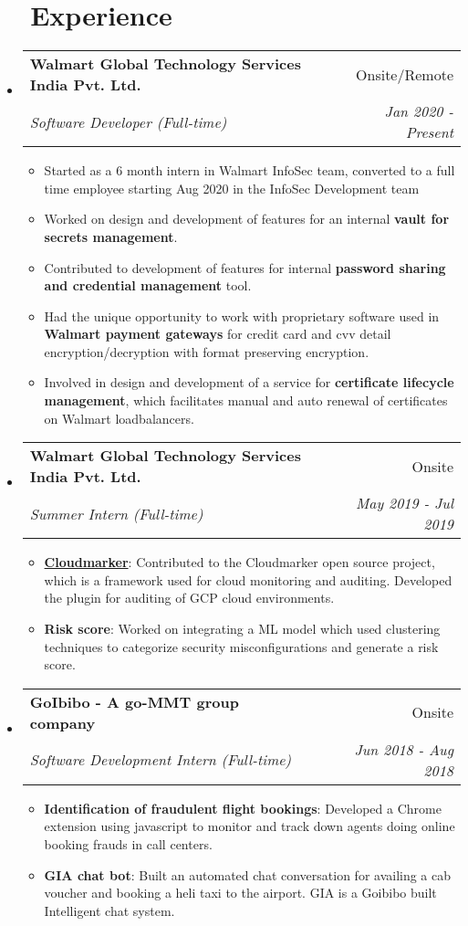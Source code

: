 \documentclass[a4paper,20pt]{article}
\makeatletter
\newcommand{\resumeItem}[2]{
  \item\small{
    \textbf{#1}{: #2 \vspace{-2pt}}
  }
}
\newcommand{\resumeSubheading}[4]{
  \vspace{-1pt}\item
    \begin{tabular*}{0.97\textwidth}{l@{\extracolsep{\fill}}r}
      \textbf{#1} & #2 \\
      \textit{#3} & \textit{#4} \\
    \end{tabular*}\vspace{-5pt}
}
\newcommand{\resumeSubHeadingListStart}{\begin{itemize}[leftmargin=*]}
\newcommand{\resumeSubHeadingListEnd}{\end{itemize}}
\newcommand{\resumeItemListStart}{\begin{itemize}}
\newcommand{\resumeItemListEnd}{\end{itemize}\vspace{-5pt}}
\makeatother
\begin{document}
\section{~~Experience}
  \resumeSubHeadingListStart
    \resumeSubheading
		{Walmart Global Technology Services India Pvt. Ltd.}{Onsite/Remote}
		{Software Developer (Full-time)}{Jan 2020 -  Present}
		  \resumeItemListStart
        \item\small{Started as a 6 month intern in Walmart InfoSec team, converted to a full time employee starting Aug 2020 in the InfoSec Development team}
        \item\small{Worked on design and development of features for an internal \textbf{vault for secrets management}.}
        \item\small{Contributed to development of features for internal \textbf{password sharing and credential management} tool.}
        \item\small{Had the unique opportunity to work with proprietary software used in \textbf{Walmart payment gateways} for credit card and cvv detail encryption/decryption with format preserving encryption.}
        \item\small{Involved in design and development of a service for \textbf{certificate lifecycle management}, which facilitates manual and auto renewal of certificates on Walmart loadbalancers.}
		  \resumeItemListEnd
\vspace{-3pt}
    \resumeSubheading
    {Walmart Global Technology Services India Pvt. Ltd.}{Onsite}
    {Summer Intern (Full-time)}{May 2019 -  Jul 2019}
      \resumeItemListStart
        \resumeItem{\color{blue}\href{https://github.com/cloudmarker/cloudmarker}{Cloudmarker}}
        {Contributed to the Cloudmarker open source project, which is a framework used for cloud monitoring and auditing. Developed the plugin for auditing of GCP cloud environments.}
        \resumeItem{Risk score}
        {Worked on integrating a ML model which used clustering techniques to categorize security misconfigurations and generate a risk score.}
      \resumeItemListEnd
\vspace{-3pt}
    \resumeSubheading{GoIbibo - A go-MMT group company}{Onsite}
    {Software Development Intern (Full-time)}{Jun 2018 - Aug 2018}
      \resumeItemListStart
        \resumeItem{Identification of fraudulent flight bookings}
          {Developed a Chrome extension using javascript to monitor and track down agents doing online booking frauds in call centers.}
        \resumeItem{GIA chat bot}
          {Built an automated chat conversation for availing a cab voucher and booking a heli taxi to the airport. GIA is a Goibibo built Intelligent chat system.}
      \resumeItemListEnd
\resumeSubHeadingListEnd
\end{document}

